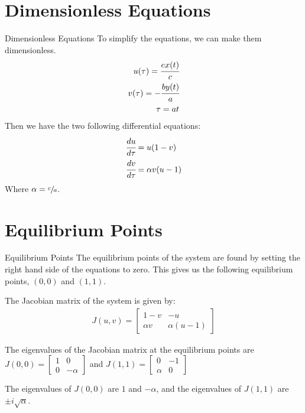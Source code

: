 \documentclass[10pt]{beamer}
\begin{document}
\section{Dimensionless Equations}
\begin{frame}{Dimensionless Equations}
    To simplify the equations, we can make them dimensionless.
    \begin{align*}
        u(\tau) = \cfrac{ex(t)}{c}  \\
        v(\tau) = -\cfrac{by(t)}{a} \\
        \tau = at
    \end{align*}
    Then we have the two following differential equations:
    \begin{align}
        \cfrac{du}{d\tau} & = u(1 - v)      \\
        \cfrac{dv}{d\tau} & = \alpha v(u-1)
    \end{align}
    Where $\alpha = \sfrac[diagonal]{c}{a}$.
\end{frame}

\section{Equilibrium Points}
\begin{frame}{Equilibrium Points}
    The equilibrium points of the system are found by setting the right hand
    side of the equations to zero. This gives us the following equilibrium
    points, $(0, 0)$ and $(1, 1)$.

    The Jacobian matrix of the system is given by:
    \begin{align*}
        J(u, v) = \begin{bmatrix}
                      1-v      & -u          \\
                      \alpha v & \alpha(u-1)
                  \end{bmatrix}
    \end{align*}

    The eigenvalues of the Jacobian matrix at the equilibrium points are
    $J(0, 0) = \begin{bmatrix}
            1 & 0       \\
            0 & -\alpha
        \end{bmatrix}$ and $J(1, 1) = \begin{bmatrix}
            0      & -1 \\
            \alpha & 0
        \end{bmatrix}$

    The eigenvalues of $J(0, 0)$ are $1$ and $-\alpha$, and the eigenvalues of
    $J(1, 1)$ are $\pm i\sqrt{\alpha}$.
\end{frame}
\end{document}
